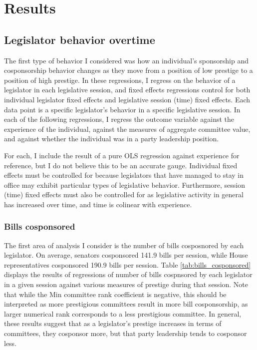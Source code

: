 \documentclass{article}
\begin{document}
\section{Results} 
\subsection{Legislator behavior overtime}
The first type of behavior I considered was how an individual's sponsorship and cosponsorship behavior changes as they move from a position of low prestige to a position of high prestige. In these regressions, I regress on the behavior of a legislator in each legislative session, and fixed effects regressions control for both individual legislator fixed effects and legislative session (time) fixed effects. Each data point is a specific legislator's behavior in a specific legislative session. In each of the following regressions, I regress the outcome variable against the experience of the individual, against the measures of aggregate committee value, and against whether the individual was in a party leadership position. 

For each, I include the result of a pure OLS regression against experience for reference, but I do not believe this to be an accurate gauge. Individual fixed effects must be controlled for because legislators that have managed to stay in office may exhibit particular types of legislative behavior. Furthermore, session (time) fixed effects must also be controlled for as legislative activity in general has increased over time, and time is colinear with experience. 

\subsubsection{Bills cosponsored}
The first area of analysis I consider is the number of bills cosposnored by each legislator. On average, senators cosponsored 141.9 bills per session, while House representatives cosponsored 190.9 bills per session. Table \ref{tab:bills_cosponsored} displays the results of regressions of number of bills cospnsored by each legislator in a given session against various measures of prestige during that session. Note that while the Min committee rank coefficient is negative, this should be interpreted as more prestigious committees result in more bill cosponsorship, as larger numerical rank corresponds to a less prestigious committee. In general, these results suggest that as a legislator's prestige increases in terms of committees, they cosponsor more, but that party leadership tends to cosponsor less. 
\end{document}
